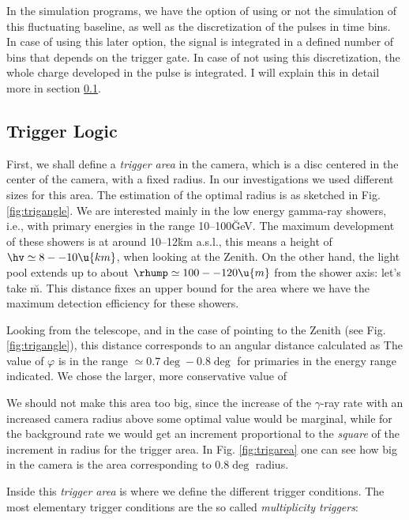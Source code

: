 \pulsefig

In the simulation programs, we have the option of using or not the
simulation of this fluctuating baseline, as well as the discretization
of the pulses in time bins. In case of using this later option, the
signal is integrated in a defined number of bins that depends on the
trigger gate. In case of not using this discretization, the whole
charge developed in the pulse is integrated. I will explain this in
detail more in section \ref{sec:triggerlogic}.

\subsection{Trigger Logic}
\label{sec:triggerlogic}
%
First, we shall define a \emph{trigger area} in the camera, which is a
disc centered in the center of the camera, with a fixed radius. In our
investigations we used different sizes for this area. The estimation
of the optimal radius is as sketched in Fig. \ref{fig:trigangle}. We
are interested mainly in the low energy gamma-ray showers, i.e., with
primary energies in the range 10--100\u{GeV}. The maximum development
of these showers is at around 10--12\u{km} a.s.l., this means a height
of $\hv \simeq 8--10\u{km}$, when looking at the Zenith. On the other
hand, the \Cherenkov light pool extends up to about
$\rhump \simeq 100--120\u{m}$ from the shower axis: let's take
\u{m}.  This distance fixes an upper bound for the area
where we have the maximum detection efficiency for these showers.

\triganglefig
%
Looking from the telescope, and in the case of pointing to the Zenith
(see Fig. \ref{fig:trigangle}), this distance corresponds to an
angular distance calculated as
%
\trigradeq
%
The value of $\varphi$ is in the range $\simeq 0.7\deg-0.8\deg$ for
primaries in the energy range indicated. We chose the larger, more
conservative value of
%
\phitriggereq

We should not make this area too big, since the increase of the
$\gamma$-ray rate with an increased camera radius above some optimal
value would be marginal, while for the background rate we would get an
increment proportional to the \emph{square} of the increment in radius
for the trigger area. In Fig. \ref{fig:trigarea} one can see how big
in the camera is the area corresponding to $0.8\deg$ radius.

\trigareafig

Inside this \emph{trigger area} is where we define the different
trigger conditions. The most elementary trigger conditions are the so
called \emph{multiplicity triggers}:

